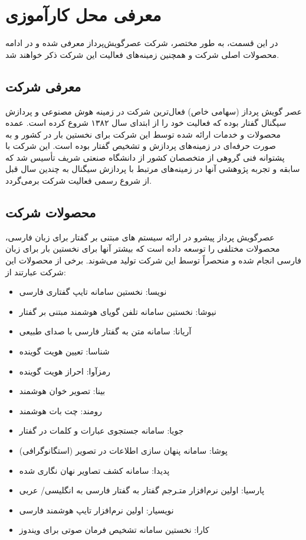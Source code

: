 \chapter{معرفی محل کارآموزی}

در این قسمت، به طور مختصر، شرکت عصرگویش‌پرداز معرفی شده و در ادامه محصولات اصلی شرکت و همچنین زمینه‌های فعالیت این شرکت ذکر خواهند شد.

\section{معرفی شرکت}

عصر گویش پرداز (سهامی خاص) فعال‌ترین شرکت در زمینه هوش مصنوعی و پردازش سیگنال گفتار بوده كه فعالیت خود را از ابتدای سال ۱۳۸۲ شروع كرده است. عمده محصولات و خدمات ارائه شده توسط این شرکت برای نخستین بار در کشور و به صورت حرفه‌ای در زمینه‌های پردازش و تشخیص گفتار بوده است. این شرکت با پشتوانه فنی گروهی از متخصصان کشور از دانشگاه صنعتی شریف تأسیس شد که سابقه و تجربه پژوهشی آنها در زمینه‌های مرتبط با پردازش سیگنال به چندین سال قبل از شروع رسمی فعالیت شرکت برمی‌گردد.

\section{محصولات شرکت}

عصرگویش پرداز پیشرو در ارائه سیستم های مبتنی بر گفتار برای زبان فارسی، محصولات مختلفی را توسعه داده است که بیشتر آنها برای نخستین بار برای زبان فارسی انجام شده و منحصراً توسط این شرکت تولید می‌شوند. برخی از محصولات این شرکت عبارتند از:
\begin{itemize}
	\item نویسا: نخستین سامانه تایپ گفتاری فارسی
	\item نیوشا: نخستین سامانه تلفن گویای هوشمند مبتنی بر گفتار
	\item آریانا: سامانه متن به گفتار فارسی با صدای طبیعی
	\item شناسا: تعیین هویت گوینده
	\item رمزآوا: احراز هویت گوینده
	\item بینا: تصویر خوان هوشمند
	\item رومند: چت بات هوشمند
	\item جویا: سامانه جستجوی عبارات و کلمات در گفتار
	\item پوشا: سامانه پنهان سازی اطلاعات در تصویر (استگانوگرافی)
	\item پدیدا: سامانه کشف تصاویر نهان نگاری شده
	\item پارسیا: اولین نرم‌افزار متـرجم گفتار به گفتار فارسی به انگلیسی/ عربی
	\item نویسیار: اولین نرم‌افزار تایپ هوشمند فارسی
	\item کارا: نخستین سامانه تشخیص فرمان صوتی برای ویندوز
\end{itemize}

